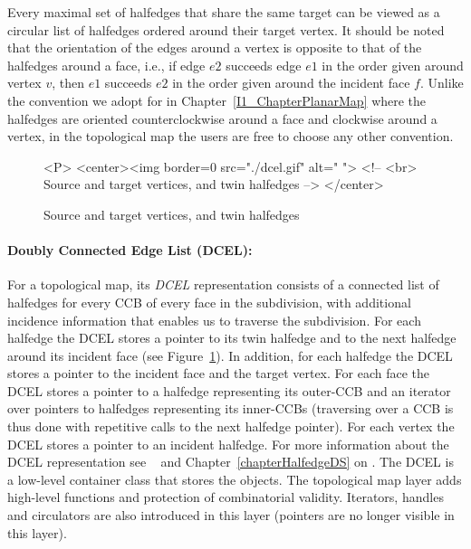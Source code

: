 Every maximal set of halfedges that share the same target can be viewed 
as a circular list of halfedges ordered %
around their target vertex.
It should be noted that the orientation of the edges around a vertex is 
opposite to that of the halfedges around a face, i.e., if edge $e2$
succeeds edge $e1$ in the order given around vertex $v$, then $e1$
succeeds $e2$ in the order given around the incident face $f$.
Unlike the convention we adopt
for  in Chapter~\ref{I1_ChapterPlanarMap} where the halfedges
are oriented counterclockwise around a face and clockwise around a vertex,
in the topological map the users are free to choose any other convention.

\begin{figure}
\begin{ccTexOnly}
    \centerline{
       }
\end{ccTexOnly}
\caption{Source and target vertices, and twin halfedges \label{fig:DCEL}}

\begin{ccHtmlOnly}
<P>
<center><img border=0 src="./dcel.gif" alt=" ">
<!-- <br> Source and target vertices, and twin halfedges -->
</center>
\end{ccHtmlOnly}
\end{figure}

\paragraph{Doubly Connected Edge List (DCEL):}
For a topological map, its {\em DCEL} representation consists of a
connected list of halfedges for every CCB of every face in the
subdivision, with additional incidence information that enables us to
traverse the subdivision. %
For each halfedge the DCEL
stores a pointer to its twin halfedge and to the next
halfedge around its incident face (see Figure~\ref{fig:DCEL}). In
addition, for each halfedge the DCEL stores a pointer to the incident
face and the target vertex.
For each face the DCEL stores a pointer to a halfedge representing
its outer-CCB and an iterator over pointers to halfedges representing
its inner-CCBs (traversing over a CCB is thus done with repetitive
calls to the next halfedge pointer).
For each vertex the DCEL stores a pointer to an incident halfedge. 
For more information about the DCEL
representation see ~\cite{bkos-cgaa-97} and Chapter~\ref{chapterHalfedgeDS}
on .
The DCEL is a low-level container class that stores the objects.
The topological map layer adds high-level functions and protection of
combinatorial validity. Iterators, handles and circulators are also
introduced in this layer (pointers are no longer visible in this layer).

